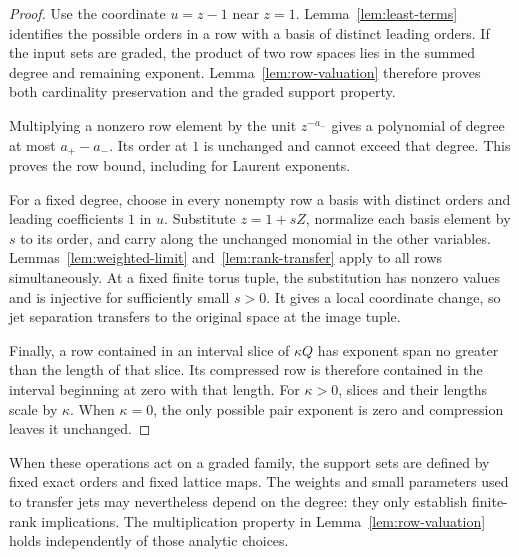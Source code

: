 \begin{proof}
Use the coordinate $u=z-1$ near $z=1$. Lemma~\ref{lem:least-terms}
identifies the possible orders in a row with a basis of distinct leading
orders. If the input sets are graded, the product of two row spaces lies in
the summed degree and remaining exponent. Lemma~\ref{lem:row-valuation}
therefore proves both cardinality preservation and the graded support
property.

Multiplying a nonzero row element by the unit $z^{-a_-}$ gives a polynomial
of degree at most $a_+-a_-$. Its order at $1$ is unchanged and cannot exceed
that degree. This proves the row bound, including for Laurent exponents.

For a fixed degree, choose in every nonempty row a basis with distinct
orders and leading coefficients $1$ in $u$. Substitute $z=1+sZ$, normalize
each basis element by $s$ to its order, and carry along the unchanged
monomial in the other variables. Lemmas~\ref{lem:weighted-limit}
and~\ref{lem:rank-transfer} apply to all rows simultaneously. At a fixed
finite torus tuple, the substitution has nonzero values and is injective
for sufficiently small $s>0$. It gives a local coordinate change, so jet
separation transfers to the original space at the image tuple.

Finally, a row contained in an interval slice of $\kappa Q$ has exponent
span no greater than the length of that slice. Its compressed row is
therefore contained in the interval beginning at zero with that length.
For $\kappa>0$, slices and their lengths scale by $\kappa$. When
$\kappa=0$, the only possible pair exponent is zero and compression leaves
it unchanged.
\end{proof}

When these operations act on a graded family, the support sets are defined
by fixed exact orders and fixed lattice maps. The weights and small
parameters used to transfer jets may nevertheless depend on the degree:
they only establish finite-rank implications. The multiplication property
in Lemma~\ref{lem:row-valuation} holds independently of those analytic
choices.
